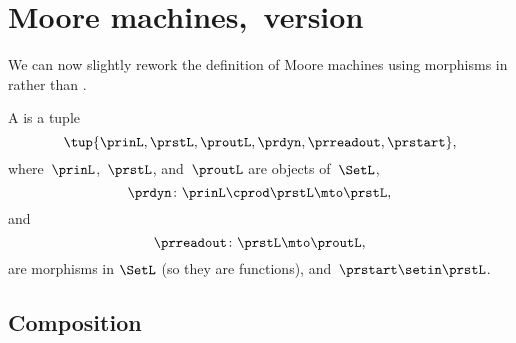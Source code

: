 
\section{Moore machines,~\SetL version}
We can now slightly rework the definition of Moore machines using morphisms in \SetL rather than \Set.
\begin{definition}
    \label{def:moore_machine_3rd}
    A  is a tuple
    \begin{equation}
        \label{eq:moore-tuple-improved-again}
        \tup{\prinL,\prstL,\proutL,\prdyn,\prreadout,\prstart},
    \end{equation}
    where~$\prinL$,~$\prstL$, and~$\proutL$ are objects of~$\SetL$,
    \begin{equation}
        \prdyn \colon \prinL \cprod \prstL \mto \prstL,
    \end{equation}
    and
    \begin{equation}
        \prreadout \colon \prstL \mto \proutL,
    \end{equation}
    are morphisms in $\SetL$ (so they are functions),
    and~$\prstart \setin \prstL$.
\end{definition}

\subsection{Composition}
\label{sec:composition-of-Moore-machines}

